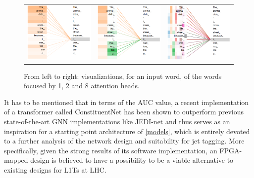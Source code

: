 \begin{figure}[!hpt]
  \centering
  \begin{tabular}{ccc}
      {\includegraphics[width=0.32\columnwidth]{background/attention_1_head.png}} &
      {\includegraphics[width=0.32\columnwidth]{background/attention_2_head.png}} & 
      {\includegraphics[width=0.32\columnwidth]{background/attention_8_head.png}}
  \end{tabular}
  \caption{From left to right: visualizations, for an input word, of the words focused by 1, 2 and 8 attention heads.}
  \label{fig:1-2-8-heads}
\end{figure}

It has to be mentioned that in terms of the AUC value, a recent implementation of a transformer called ConstituentNet \cite{3-yuan2021constituentnet:} has been shown to outperform previous state-of-the-art GNN implementations like JEDI-net \cite{9-newman2019jedi-net:} and thus serves as an inspiration for a starting point architecture of \cref{models}, which is entirely devoted to a further analysis of the network design and suitability for jet tagging. More specifically, given the strong results of its software implementation, an FPGA-mapped design is believed to have a possibility to be a viable alternative to existing designs for L1Ts at LHC.